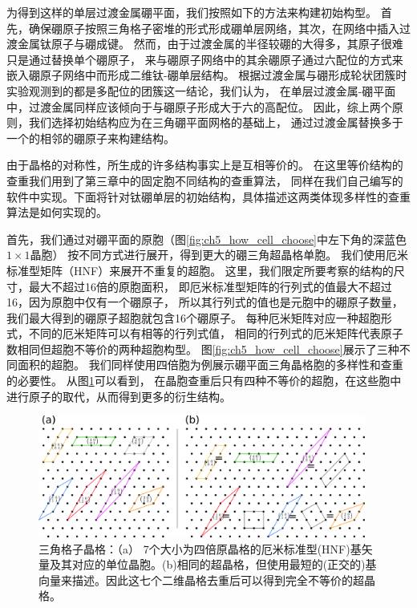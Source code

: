 为得到这样的单层过渡金属硼平面，我们按照如下的方法来构建初始构型。
首先，确保硼原子按照三角格子密堆的形式形成硼单层网络，其次，在网络中插入过渡金属钛原子与硼成键。
然而，由于过渡金属的半径较硼的大得多，其原子很难只是通过替换单个硼原子，
来与硼原子网络中的其余硼原子通过六配位的方式来嵌入硼原子网络中而形成二维钛-硼单层结构。
根据过渡金属与硼形成轮状团簇时实验观测到的都是多配位的团簇这一结论，我们认为，
在单层过渡金属-硼平面中，过渡金属同样应该倾向于与硼原子形成大于六的高配位。
因此，综上两个原则，我们选择初始结构应为在三角硼平面网格的基础上，
通过过渡金属替换多于一个的相邻的硼原子来构建结构。

由于晶格的对称性，所生成的许多结构事实上是互相等价的。
在这里等价结构的查重我们用到了第三章中的固定胞不同结构的查重算法，
同样在我们自己编写的软件中实现。下面将针对钛硼单层的初始结构，具体描述这两类体现多样性的查重算法是如何实现的。

首先，我们通过对硼平面的原胞（图\ref{fig:ch5_how_cell_choose}中左下角的深蓝色$1\times 1$晶胞）
按不同方式进行展开，得到更大的硼三角超晶格单胞。
我们使用厄米标准型矩阵（HNF）\cite{hart2008algorithm}来展开不重复的超胞。
这里，我们限定所要考察的结构的尺寸，最大不超过\num{16}倍的原胞面积，
即厄米标准型矩阵的行列式的值最大不超过\num{16}，因为原胞中仅有一个硼原子，
所以其行列式的值也是元胞中的硼原子数量，我们最大得到的硼原子超胞就包含\num{16}个硼原子。
每种厄米矩阵对应一种超胞形式，不同的厄米矩阵可以有相等的行列式值，
相同的行列式的厄米矩阵代表原子数相同但超胞不等价的两种超胞构型。
图\ref{fig:ch5_how_cell_choose}展示了三种不同面积的超胞。
我们同样使用四倍胞为例展示硼平面三角晶格胞的多样性和查重的必要性。
从图\ref{fig:ch4_2d_tri_lattice}可以看到，
在晶胞查重后只有四种不等价的超胞，在这些胞中进行原子的取代，从而得到更多的衍生结构。

\begin{figure}
  \includegraphics[width=0.96\textwidth]{figs/ch4_2d_tri_lattice.png}
  \centering
  \caption{三角格子晶格：（a） 7个大小为四倍原晶格的厄米标准型(HNF)基矢量及其对应的单位晶胞。(b)相同的超晶格，但使用最短的(正交的)基向量来描述。因此这七个二维晶格去重后可以得到完全不等价的超晶格。}
  \label{fig:ch4_2d_tri_lattice}
\end{figure}

